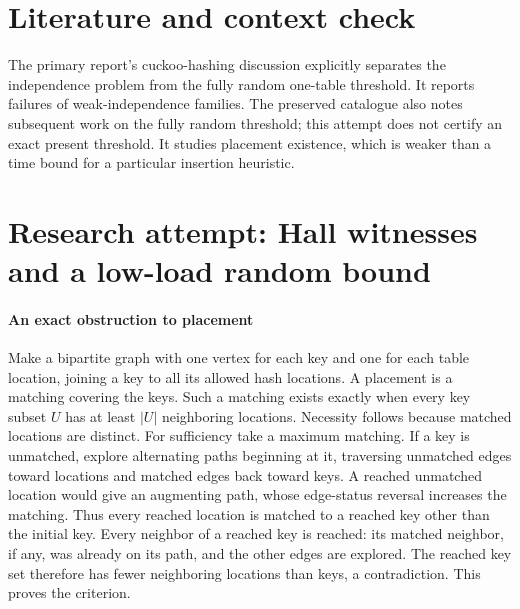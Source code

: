 \documentclass[11pt]{article}
\begin{document}
\section{Literature and context check}
The primary report's cuckoo-hashing discussion explicitly separates the independence problem from the fully random one-table threshold. It reports failures of weak-independence families. The preserved catalogue also notes subsequent work on the fully random threshold; this attempt does not certify an exact present threshold. It studies placement existence, which is weaker than a time bound for a particular insertion heuristic.
\section{Research attempt: Hall witnesses and a low-load random bound}

\paragraph{An exact obstruction to placement}
Make a bipartite graph with one vertex for each key and one for each table location, joining a key to all its allowed hash locations. A placement is a matching covering the keys. Such a matching exists exactly when every key subset $U$ has at least $|U|$ neighboring locations. Necessity follows because matched locations are distinct. For sufficiency take a maximum matching. If a key is unmatched, explore alternating paths beginning at it, traversing unmatched edges toward locations and matched edges back toward keys. A reached unmatched location would give an augmenting path, whose edge-status reversal increases the matching. Thus every reached location is matched to a reached key other than the initial key. Every neighbor of a reached key is reached: its matched neighbor, if any, was already on its path, and the other edges are explored. The reached key set therefore has fewer neighboring locations than keys, a contradiction. This proves the criterion.
\end{document}
